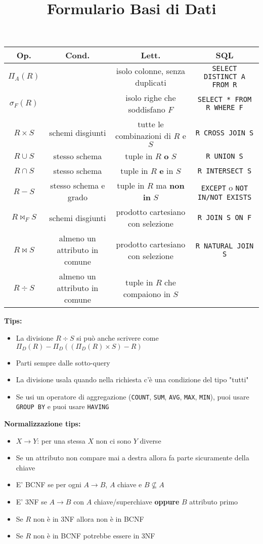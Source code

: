\documentclass[10pt]{article}
\title{Formulario Basi di Dati}
\date{}
\begin{document}
\maketitle
\begin{table}[h]
    \centering
    \begin{tabular}{|c|c|c|c|}
        \hline
        \textbf{Op.} & \textbf{Cond.} & \textbf{Lett.} & \textbf{SQL}\\
        \hline
        $\Pi_{A}(R)$ &  & isolo colonne, senza duplicati & \texttt{SELECT DISTINCT A FROM R}\\
        $\sigma_{F}(R)$ &  & isolo righe che soddisfano $F$ & \texttt{SELECT * FROM R WHERE F}\\
        $R \times S$ & schemi disgiunti & tutte le combinazioni di $R$ e $S$ & \texttt{R CROSS JOIN S}\\
        $R \cup S$ & stesso schema & tuple in $R$ \textbf{o} $S$ & \texttt{R UNION S}\\
        $R \cap S$ & stesso schema & tuple in $R$ \textbf{e} in $S$ & \texttt{R INTERSECT S}\\
        $R - S$ & stesso schema e grado & tuple in $R$ ma \textbf{non in} $S$ & \texttt{EXCEPT} o \texttt{NOT IN/NOT EXISTS}\\
        $R \bowtie_{F} S$ & schemi disgiunti & prodotto cartesiano con selezione & \texttt{R JOIN S ON F}\\
        $R \bowtie S$ & almeno un attributo in comune & prodotto cartesiano con selezione & \texttt{R NATURAL JOIN S}\\
        $R \div S$ & almeno un attributo in comune & tuple in $R$ che compaiono in $S$ & \\
        \hline
    \end{tabular}
\end{table}
\textbf{Tips:}
\begin{itemize}
    \item La divisione $R \div S$ si può anche scrivere come $\Pi_{D}(R) - \Pi_{D}((\Pi_{D}(R)\times S)-R)$
    \item Parti sempre dalle sotto-query
    \item La divisione usala quando nella richiesta c'è una condizione del tipo "tutti"
    \item Se usi un operatore di aggregazione (\texttt{COUNT}, \texttt{SUM}, \texttt{AVG}, \texttt{MAX}, \texttt{MIN}), puoi usare \texttt{GROUP BY} e puoi usare \texttt{HAVING}
\end{itemize}
\textbf{Normalizzazione tips:}
\begin{itemize}
    \item $X \rightarrow Y$: per una stessa $X$ non ci sono $Y$ diverse
    \item Se un attributo non compare mai a destra allora fa parte sicuramente della chiave
    \item E' BCNF se per ogni $A\rightarrow B$, $A$ chiave e $B \nsubseteq A$
    \item E' 3NF se $A\rightarrow B$ con $A$ chiave/superchiave \textbf{oppure} $B$ attributo primo
    \item Se $R$ non è in 3NF allora non è in BCNF
    \item Se $R$ non è in BCNF potrebbe essere in 3NF
\end{itemize}
\end{document}
